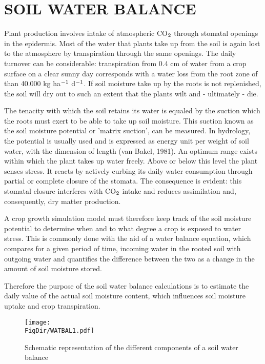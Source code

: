 \chapter{SOIL WATER BALANCE}

Plant production involves intake of atmospheric CO$_{{\rm 2}}$ through stomatal openings in the
epidermis. Most of the water that plants take up from the soil is again lost to the
atmosphere by transpiration through the same openings. The daily turnover can be
considerable: transpiration from 0.4 cm of water from a crop surface on a clear sunny
day corresponds with a water loss from the root zone of than 40.000 kg ha$^{{\rm -1}}$ 
d$^{{\rm -1}}$. If soil
moisture take up by the roots is not replenished, the soil will dry out to such an extent
that the plants wilt and - ultimately - die.

The tenacity with which the soil retains its water is equaled by the suction which the
roots must exert to be able to take up soil moisture. This suction known as the soil
moisture potential or 'matrix suction', can be measured. In hydrology, the potential is
usually used and is expressed as energy unit per weight of soil water, with the dimension
of length (van Bakel, 1981). An optimum range exists within which the plant takes up
water freely. Above or below this level the plant senses stress. It reacts by actively
curbing its daily water consumption through partial or complete closure of the stomata.
The consequence is evident: this stomatal closure interferes with CO$_{{\rm 2}}$ intake and 
reduces assimilation and, consequently, dry matter production.

A crop growth simulation model must therefore keep track of the soil moisture potential
to determine when and to what degree a crop is exposed to water stress. This is commonly 
done with the aid of a water balance equation, which compares for a given period of
time, incoming water in the rooted soil with outgoing water and quantifies the difference
between the two as a change in the amount of soil moisture stored.

Therefore the purpose of the soil water balance calculations is to estimate the daily value
of the actual soil moisture content, which influences soil moisture uptake and crop
transpiration.

\begin{figure}[p]
\centering
\texttt{[image: \\FigDir/WATBAL1.pdf]}
\caption{Schematic representation of the different components of a soil water balance}
\label{fig:WatBalSchematic}
\end{figure}

